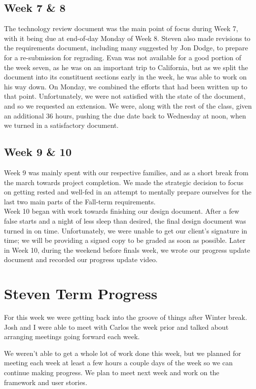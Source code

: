\documentclass[onecolumn, draftclsnofoot,10pt, compsoc]{IEEEtran}
\begin{document}
\subsection{Week 7 \& 8}
The technology review document was the main point of focus during Week 7, with
it being due at end-of-day Monday of Week 8. Steven also made revisions to the
requirements document, including many suggested by Jon Dodge, to prepare for a
re-submission for regrading. Evan was not available for a good portion of the
week seven, as he was on an important trip to California, but as we split the
document into its constituent sections early in the week, he was able to work
on his way down. On Monday, we combined the efforts that had been written up
to that point. Unfortunately, we were not satisfied with the state of the
document, and so we requested an extension. We were, along with the rest of
the class, given an additional 36 hours, pushing the due date back to Wednesday
at noon, when we turned in a satisfactory document.


\subsection{Week 9 \& 10}
Week 9 was mainly spent with our respective families, and as a short break from
the march towards project completion. We made the strategic decision to focus
on getting rested and well-fed in an attempt to mentally prepare ourselves for
the last two main parts of the Fall-term requirements. \\

\noindent Week 10 began with work towards finishing our design document.
After a few false starts and a night of less sleep than desired, the final
design document was turned in on time. Unfortunately, we were unable to get
our client's signature in time; we will be providing a signed copy to be graded
as soon as possible. Later in Week 10, during the weekend before finals week,
we wrote our progress update document and recorded our progress update video.


\section{Steven Term Progress}
For this week we were getting back into the groove of things after Winter break.
Josh and I were able to meet with Carlos the week prior and talked about
arranging meetings going forward each week.

We weren't able to get a whole lot of work done this week, but we planned for
meeting each week at least a few hours a couple days of the week so we can
continue making progress. We plan to meet next week and work on the framework
and user stories.
\end{document}
